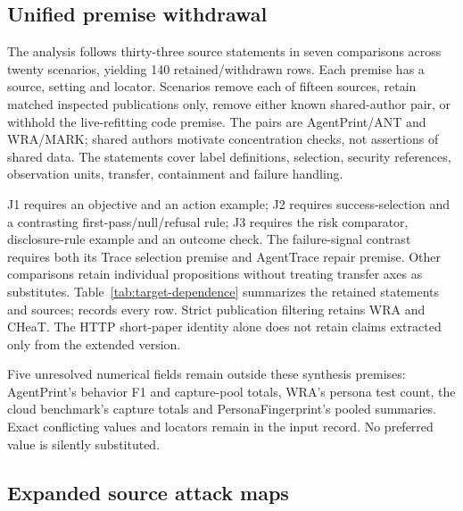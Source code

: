 \subsection{Unified premise withdrawal}\label{supp:conclusion-withdrawal}
The analysis follows thirty-three source statements in seven comparisons across twenty scenarios, yielding 140 retained/withdrawn rows. Each premise has a source, setting and locator. Scenarios remove each of fifteen sources, retain matched inspected publications only, remove either known shared-author pair, or withhold the live-refitting code premise. The pairs are AgentPrint/ANT and WRA/MARK; shared authors motivate concentration checks, not assertions of shared data. The statements cover label definitions, selection, security references, observation units, transfer, containment and failure handling.

J1 requires an objective and an action example; J2 requires success-selection and a contrasting first-pass/null/refusal rule; J3 requires the risk comparator, disclosure-rule example and an outcome check. The failure-signal contrast requires both its Trace selection premise and AgentTrace repair premise. Other comparisons retain individual propositions without treating transfer axes as substitutes. Table~\ref{tab:target-dependence} summarizes the retained statements and sources;  records every row. Strict publication filtering retains WRA and CHeaT. The HTTP short-paper identity alone does not retain claims extracted only from the extended version.


Five unresolved numerical fields remain outside these synthesis premises: AgentPrint's behavior F1 and capture-pool totals, WRA's persona test count, the cloud benchmark's capture totals and PersonaFingerprint's pooled summaries. Exact conflicting values and locators remain in the input record. No preferred value is silently substituted.

\subsection{Expanded source attack maps}


\FloatBarrier
